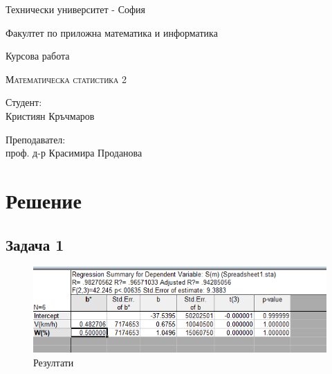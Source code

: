 \documentclass[a4paper,fleqn,12pt]{article}
\begin{document}
\begin{titlepage}
	\setlength{\parindent}{0pt}
	\large
\centering
Технически университет -  София \par
Факултет по приложна математика и информатика \par
\vspace{2cm}

{\huge Курсова работа \par}

\vspace{2cm}

\vspace{1cm}
{\LARGE\scshape Математическа статистика 2 \par}



\vfill

\begin{minipage}[t]{.5\linewidth}
	Студент: \\
	Кристиян Кръчмаров
\end{minipage}%
\begin{minipage}[t]{.5\linewidth}
	\raggedleft
	Преподавател:\\
	проф. д-р Красимира Проданова
\end{minipage}

\vspace{2cm}
\raggedright

\end{titlepage}
\tableofcontents
\newpage


\newpage
{}
\section{Решение}
\subsection{Задача 1}
\begin{figure}[h]
  \centering
  \includegraphics[width=\linewidth]{task1-1.png}
  \caption{Резултати}
\end{figure}
\end{document}
